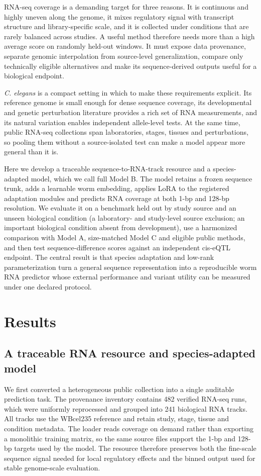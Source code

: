 \documentclass[pdflatex,sn-nature]{sn-jnl}
\newcommand{\ExtIsolation}{a laboratory- and study-level source exclusion}
\newcommand{\ExtCondition}{an important biological condition absent from development}
\begin{document}
RNA-seq coverage is a demanding target for three reasons. It is continuous and
highly uneven along the genome, it mixes regulatory signal with transcript
structure and library-specific scale, and it is collected under conditions
that are rarely balanced across studies. A useful method therefore needs more
than a high average score on randomly held-out windows. It must expose data
provenance, separate genomic interpolation from source-level generalization,
compare only technically eligible alternatives and make its sequence-derived
outputs useful for a biological endpoint.

\textit{C. elegans} is a compact setting in which to make these requirements
explicit. Its reference genome is small enough for dense sequence coverage,
its developmental and genetic perturbation literature provides a rich set of
RNA measurements, and its natural variation enables independent allele-level
tests. At the same time, public RNA-seq collections span laboratories, stages,
tissues and perturbations, so pooling them without a source-isolated test can
make a model appear more general than it is.

Here we develop a traceable sequence-to-RNA-track resource and a species-
adapted model, which we call full Model B. The model retains a frozen sequence
trunk, adds a learnable worm embedding, applies LoRA to the registered
adaptation modules and predicts RNA coverage at both 1-bp and 128-bp
resolution. We evaluate it on a benchmark held out by study source and an
unseen biological condition (\ExtIsolation; \ExtCondition), use a harmonized
comparison with Model A, size-matched Model C and eligible public methods, and
then test sequence-difference scores against an independent cis-eQTL endpoint.
The central result is that species adaptation and low-rank parameterization
turn a general sequence representation into a reproducible worm RNA predictor
whose external performance and variant utility can be measured under one
declared protocol.

\section{Results}\label{sec:results}

\subsection{A traceable RNA resource and species-adapted model}

We first converted a heterogeneous public collection into a single auditable
prediction task. The provenance inventory contains 482 verified RNA-seq runs,
which were uniformly reprocessed and grouped into 241 biological RNA tracks.
All tracks use the WBcel235 reference and retain study, stage, tissue and
condition metadata. The loader reads coverage on demand rather than exporting
a monolithic training matrix, so the same source files support the 1-bp and
128-bp targets used by the model. The resource therefore preserves both the
fine-scale sequence signal needed for local regulatory effects and the binned
output used for stable genome-scale evaluation.
\end{document}
